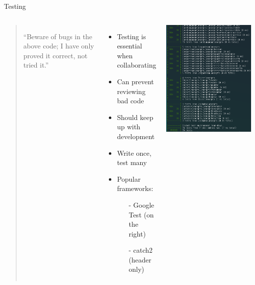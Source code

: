 \documentclass{beamer}
\begin{document}
\begin{frame}{Testing}
	\begin{columns}[onlytextwidth]
		\begin{quote}
			\enquote{Beware of bugs in the above code; I have only proved it correct, not tried it.}\\
		\end{quote}
		\begin{itemize}
			\item Testing is essential when collaborating
			\item Can prevent reviewing bad code
			\item Should keep up with development
			\item Write once, test many
			\item Popular frameworks:
			\begin{itemize}
				\item[-] Google Test (on the right)
				\item[-] catch2 (header only)
			\end{itemize}
		\end{itemize}
		\includegraphics[keepaspectratio=true, width=1\linewidth]{figures/gtest.png}
	\end{columns}
\end{frame}
\end{document}
